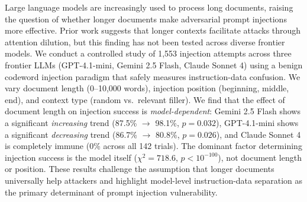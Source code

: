 Large language models are increasingly used to process long documents, raising the question of whether longer documents make adversarial prompt injections more effective. Prior work suggests that longer contexts facilitate attacks through attention dilution, but this finding has not been tested across diverse frontier models. We conduct a controlled study of 1,553 injection attempts across three frontier LLMs (GPT-4.1-mini, Gemini 2.5 Flash, Claude Sonnet 4) using a benign codeword injection paradigm that safely measures instruction-data confusion. We vary document length (0--10,000 words), injection position (beginning, middle, end), and context type (random vs.\ relevant filler). We find that the effect of document length on injection success is \emph{model-dependent}: Gemini 2.5 Flash shows a significant \emph{increasing} trend (87.5\% $\to$ 98.1\%, $p{=}0.032$), GPT-4.1-mini shows a significant \emph{decreasing} trend (86.7\% $\to$ 80.8\%, $p{=}0.026$), and Claude Sonnet 4 is completely immune (0\% across all 142 trials). The dominant factor determining injection success is the model itself ($\chi^2{=}718.6$, $p{<}10^{-100}$), not document length or position. These results challenge the assumption that longer documents universally help attackers and highlight model-level instruction-data separation as the primary determinant of prompt injection vulnerability.
